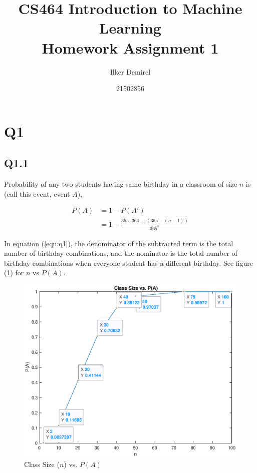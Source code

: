 \documentclass[12pt]{report}
\begin{document}
\title{CS464 Introduction to Machine Learning \\ Homework Assignment 1} 
\author{Ilker Demirel}
\date{21502856}
\maketitle

\section*{Q1}
\subsection*{Q1.1}
Probability of any two students having same birthday in a classroom of size $n$ is (call this event, event $A$),

\begin{align} \label{eqn:q1}
P(A) &= 1 - P(A') \nonumber \\
&= 1 - \frac{365 \cdot 364 \dots \cdot (365 - (n - 1))}{365^n}
\end{align}

In equation (\ref{eqn:q1}), the denominator of the subtracted term is the total number of birthday combinations, and the nominator is the total number of birthday combinations when everyone student has a different birthday. See figure (\ref{fig:q1}) for $n$ vs $P(A)$.

\begin{figure}[h!]
  \includegraphics[width = \textwidth]{q1_1}
  \caption{Class Size ($n$) vs. $P(A)$}
  \label{fig:q1}
\end{figure}
\end{document}
